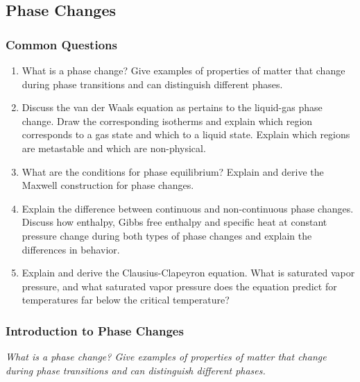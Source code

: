 \documentclass[11pt, a4paper]{article}
\begin{document}
\subsection{Phase Changes}

\subsubsection{Common Questions}
\begin{enumerate}
    \item What is a phase change? Give examples of properties of matter that change during phase transitions and can distinguish different phases.

    \item Discuss the van der Waals equation as pertains to the liquid-gas phase change. Draw the corresponding isotherms and explain which region corresponds to a gas state and which to a liquid state. Explain which regions are metastable and which are non-physical.

    \item What are the conditions for phase equilibrium? Explain and derive the Maxwell construction for phase changes.

    \item Explain the difference between continuous and non-continuous phase changes. Discuss how enthalpy, Gibbs free enthalpy and specific heat at constant pressure change during both types of phase changes and explain the differences in behavior.

    \item Explain and derive the Clausius-Clapeyron equation. What is saturated vapor pressure, and what saturated vapor pressure does the equation predict for temperatures far below the critical temperature? 

\end{enumerate}


\subsubsection{Introduction to Phase Changes}
\textit{What is a phase change? Give examples of properties of matter that change during phase transitions and can distinguish different phases.}
\end{document}
